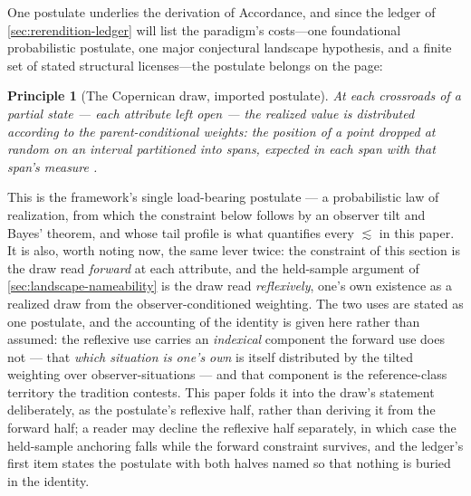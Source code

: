 \documentclass[11pt]{article}
\newtheorem{principle}{Principle}
\theoremstyle{definition}
\begin{document}
One postulate underlies the derivation of Accordance, and since the ledger of \autoref{sec:rerendition-ledger} will list the paradigm's costs---one foundational probabilistic postulate, one major conjectural landscape hypothesis, and a finite set of stated structural licenses---the postulate belongs on the page:

\begin{principle}[The Copernican draw, imported postulate]
\label{prin:draw-imported}
At each crossroads of a partial state --- each attribute left open --- the realized value is distributed according to the parent-conditional weights: the position of a point dropped at random on an interval partitioned into spans, expected in each span with that span's measure \cite{Nexus, NexicFoundation}.
\end{principle}

This is the framework's single load-bearing postulate --- a probabilistic law of realization, from which the constraint below follows by an observer tilt and Bayes' theorem, and whose tail profile is what quantifies every $\lesssim$ in this paper. It is also, worth noting now, the same lever twice: the constraint of this section is the draw read \emph{forward} at each attribute, and the held-sample argument of \autoref{sec:landscape-nameability} is the draw read \emph{reflexively}, one's own existence as a realized draw from the observer-conditioned weighting. The two uses are stated as one postulate, and the accounting of the identity is given here rather than assumed: the reflexive use carries an \emph{indexical} component the forward use does not --- that \emph{which situation is one's own} is itself distributed by the tilted weighting over observer-situations --- and that component is the reference-class territory the tradition contests. This paper folds it into the draw's statement deliberately, as the postulate's reflexive half, rather than deriving it from the forward half; a reader may decline the reflexive half separately, in which case the held-sample anchoring falls while the forward constraint survives, and the ledger's first item states the postulate with both halves named so that nothing is buried in the identity.
\end{document}
